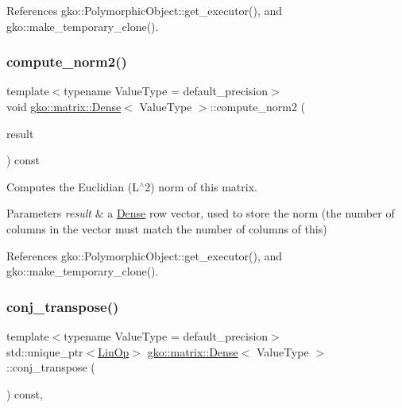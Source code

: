 References gko\+::\+Polymorphic\+Object\+::get\+\_\+executor(), and gko\+::make\+\_\+temporary\+\_\+clone().

\mbox{\label{classgko_1_1matrix_1_1Dense_a97fd354c4a26814586cd256b5f0d7bea}} 
\subsubsection{\texorpdfstring{compute\+\_\+norm2()}{compute\_norm2()}}
{\footnotesize\ttfamily template$<$typename Value\+Type = default\+\_\+precision$>$ \\
void \hyperlink{classgko_1_1matrix_1_1Dense}{gko\+::matrix\+::\+Dense}$<$ Value\+Type $>$\+::compute\+\_\+norm2 (\begin{DoxyParamCaption}\item[{\hyperlink{classgko_1_1LinOp}{Lin\+Op} $\ast$}]{result }\end{DoxyParamCaption}) const}



Computes the Euclidian (L$^\wedge$2) norm of this matrix. 


\begin{DoxyParams}{Parameters}
{\em result} & a \hyperlink{classgko_1_1matrix_1_1Dense}{Dense} row vector, used to store the norm (the number of columns in the vector must match the number of columns of this) \\
\hline
\end{DoxyParams}


References gko\+::\+Polymorphic\+Object\+::get\+\_\+executor(), and gko\+::make\+\_\+temporary\+\_\+clone().

\mbox{\label{classgko_1_1matrix_1_1Dense_a19890b1448497a50d57c16ed4c3bd820}} 
\subsubsection{\texorpdfstring{conj\+\_\+transpose()}{conj\_transpose()}}
{\footnotesize\ttfamily template$<$typename Value\+Type = default\+\_\+precision$>$ \\
std\+::unique\+\_\+ptr$<$\hyperlink{classgko_1_1LinOp}{Lin\+Op}$>$ \hyperlink{classgko_1_1matrix_1_1Dense}{gko\+::matrix\+::\+Dense}$<$ Value\+Type $>$\+::conj\+\_\+transpose (\begin{DoxyParamCaption}{ }\end{DoxyParamCaption}) const\hspace{0.3cm}{\ttfamily [override]}, {\ttfamily [virtual]}}




